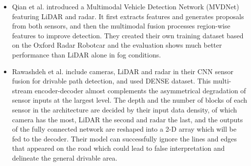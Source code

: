 \documentclass[rnd]{mas_proposal}
\begin{document}
\begin{itemize}
    \item Qian et al. \cite{qian2021robust} introduced a Multimodal Vehicle Detection Network (MVDNet) featuring LiDAR and radar. It first extracts features and generates proposals from both sensors, and then the multimodal fusion processes region-wise features to improve detection. They created their own training dataset based on the Oxford Radar Robotcar \cite{barnes2020oxford} and the evaluation shows much better performance than LiDAR alone in fog conditions.

    \item Rawashdeh et al. \cite{rawashdeh2021drivable} include cameras, LiDAR and radar in their CNN sensor fusion for drivable path detection, and used DENSE \cite{bijelic2020seeing} dataset. This multi-stream encoder-decoder almost complements the asymmetrical degradation of sensor inputs at the largest level. The depth and the number of blocks of each sensor in the architecture are decided by their input data density, of which camera has the most, LiDAR the second and radar the last, and the outputs of the fully connected network are reshaped into a 2-D array which will be fed to the decoder. Their model can successfully ignore the lines and edges that appeared on the road which could lead to false interpretation and delineate the general drivable area.


\end{itemize}
\end{document}
